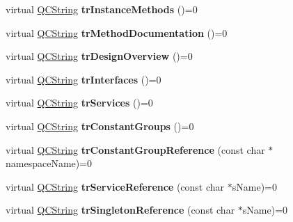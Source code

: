 \begin{DoxyCompactItemize}
\item 
\mbox{\label{class_translator_a51e57e0c406deea98a63e914a626eca6}} 
virtual \mbox{\hyperlink{class_q_c_string}{Q\+C\+String}} {\bfseries tr\+Instance\+Methods} ()=0
\item 
\mbox{\label{class_translator_a3bc5923ca3f5c0903cb3c94bdbabb8b3}} 
virtual \mbox{\hyperlink{class_q_c_string}{Q\+C\+String}} {\bfseries tr\+Method\+Documentation} ()=0
\item 
\mbox{\label{class_translator_a025117e585ec0a86fe1a395977d8a94c}} 
virtual \mbox{\hyperlink{class_q_c_string}{Q\+C\+String}} {\bfseries tr\+Design\+Overview} ()=0
\item 
\mbox{\label{class_translator_a9307d88ecc721be9da078cfcc87c0239}} 
virtual \mbox{\hyperlink{class_q_c_string}{Q\+C\+String}} {\bfseries tr\+Interfaces} ()=0
\item 
\mbox{\label{class_translator_aa3d6ef2fa2f254b99c66c67c8b2e8ec3}} 
virtual \mbox{\hyperlink{class_q_c_string}{Q\+C\+String}} {\bfseries tr\+Services} ()=0
\item 
\mbox{\label{class_translator_a5b6e4ccf6b60056e1e525f90b924ce61}} 
virtual \mbox{\hyperlink{class_q_c_string}{Q\+C\+String}} {\bfseries tr\+Constant\+Groups} ()=0
\item 
\mbox{\label{class_translator_a152f488fd9c82cdb2d0f1d58003435ab}} 
virtual \mbox{\hyperlink{class_q_c_string}{Q\+C\+String}} {\bfseries tr\+Constant\+Group\+Reference} (const char $\ast$namespace\+Name)=0
\item 
\mbox{\label{class_translator_a61685c2948befa6e5b1c29b92511d970}} 
virtual \mbox{\hyperlink{class_q_c_string}{Q\+C\+String}} {\bfseries tr\+Service\+Reference} (const char $\ast$s\+Name)=0
\item 
\mbox{\label{class_translator_a1b548cbe43effc910b9996e72e6b215b}} 
virtual \mbox{\hyperlink{class_q_c_string}{Q\+C\+String}} {\bfseries tr\+Singleton\+Reference} (const char $\ast$s\+Name)=0
\item 

\end{DoxyCompactItemize}
